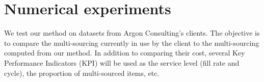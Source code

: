 \chapter{Numerical experiments}
\label{chap:multi-sourcing:numerical-experiments}


We test our method on datasets from Argon Consulting’s clients.
The objective is to compare the multi-sourcing currently in use by the client to the multi-sourcing computed from our method.
In addition to comparing their cost, several Key Performance Indicators (KPI) will be used as the  service level (fill rate and cycle), the proportion of multi-sourced items, etc.












